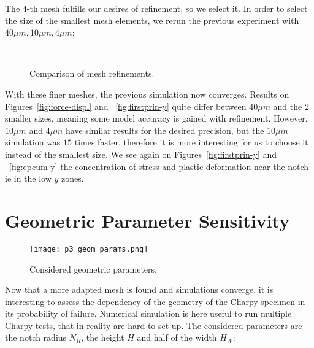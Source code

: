\documentclass[
10pt, %
a4paper, %
oneside, %
headinclude,footinclude, %
BCOR5mm, %
]{scrartcl}
\begin{document}
The $4$-th mesh fulfills our desires of refinement, so we select it.
In order to select the size of the smallest mesh elements, we rerun the
previous experiment with $40 \mu m, 10 \mu m, 4 \mu m$:

\begin{figure}[ht]
    \centering
    \hfill
    \\
    \hfill
    \caption{Comparison of mesh refinements.}
    \label{fig:res_exp_refine}
\end{figure}

With these finer meshes, the previous simulation now converges.
Results on Figures~\ref{fig:force-displ} and ~\ref{fig:firstprin-y} quite differ between $40 \mu m$
and the $2$ smaller sizes, meaning some model accuracy is gained with refinement.
However, $10 \mu m$ and $4 \mu m$ have similar results for the desired precision,
but the $10 \mu m$ simulation was $15$ times faster, therefore it is
more interesting for us to choose it instead of the smallest size.
We see again on Figures~\ref{fig:firstprin-y} and ~\ref{fig:epcum-y} the concentration
of stress and plastic deformation near the notch ie in the low $y$ zones.

\section{Geometric Parameter Sensitivity}

\begin{wrapfigure}{r}{0.5\textwidth}
    \centering
    \texttt{[image: p3\_geom\_params.png]}
    \caption{Considered geometric parameters.}
\end{wrapfigure}

Now that a more adapted mesh is found and simulations converge,
it is interesting to assess the dependency of the geometry of the Charpy specimen
in its probability of failure. Numerical simulation is here useful
to run multiple Charpy tests, that in reality are hard to set up.
The considered parameters are the notch radius $N_R$, the height $H$
and half of the width $H_W$:
\end{document}
